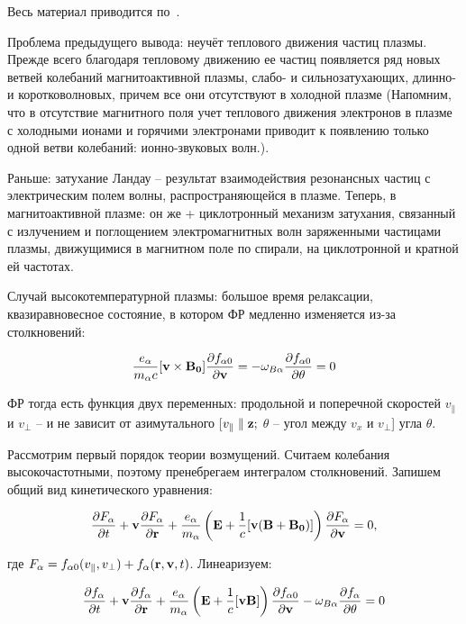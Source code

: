 \documentclass[10pt, a4paper]{article}
\begin{document}
Весь материал приводится по~\cite{akhiezer}.

Проблема предыдущего вывода: неучёт теплового движения частиц плазмы. Прежде всего благодаря тепловому движению ее частиц появляется ряд новых ветвей колебаний магнитоактивной плазмы, слабо- и сильнозатухающих, длинно- и коротковолновых, причем все они отсутствуют в холодной плазме (Напомним, что в отсутствие магнитного поля учет теплового движения электронов в плазме с холодными ионами и горячими электронами приводит к появлению только одной ветви колебаний: ионно-звуковых волн.).

Раньше: затухание Ландау -- результат взаимодействия резонансных частиц с электрическим полем волны, распространяющейся в плазме. Теперь, в магнитоактивной плазме: он же + циклотронный механизм затухания, связанный с излучением и поглощением электромагнитных волн заряженными частицами плазмы, движущимися в магнитном поле по спирали, на циклотронной и кратной ей частотах.

Случай высокотемпературной плазмы: большое время релаксации, квазиравновесное состояние, в котором ФР медленно изменяется из-за столкновений:

\begin{equation*}
	\frac{e_\alpha}{m_\alpha c}[\vb{v}\times\vb{B_0}]\pdv{f_{\alpha 0}}{\vb{v}}=-\omega_{B\alpha}\pdv{f_{\alpha 0}}{\theta} = 0
\end{equation*}

ФР тогда есть функция двух переменных: продольной и поперечной скоростей $v_\parallel$ и $v_\perp$ -- и не зависит от азимутального [$v_\parallel \parallel \vb{z};$  $\theta$ -- угол между $v_x$ и $v_\perp$] угла $\theta$.

Рассмотрим первый порядок теории возмущений. Считаем колебания высокочастотными, поэтому пренебрегаем интегралом столкновений. Запишем общий вид кинетического уравнения:

\begin{equation*}
	\pdv{F_\alpha}{t}+\vb{v}\pdv{F_\alpha}{\vb{r}}+\frac{e_\alpha}{m_\alpha}\left(\vb{E}+\frac{1}{c}[\vb{v}(\vb{B}+\vb{B_0})]\right)\pdv{F_\alpha}{\vb{v}}=0,
\end{equation*} 

где $F_\alpha = f_{\alpha 0}(v_\parallel, v_\perp)+f_\alpha(\vb{r},\vb{v},t)$. Линеаризуем:

\begin{equation*}
	\pdv{f_\alpha}{t}+\vb{v}\pdv{f_\alpha}{\vb{r}}+\frac{e_\alpha}{m_\alpha}\left(\vb{E}+\frac{1}{c}[\vb{v}\vb{B}]\right)\pdv{f_{\alpha 0}}{\vb{v}}-\omega_{B\alpha}\pdv{f_\alpha}{\theta}=0
\end{equation*}
\end{document}
